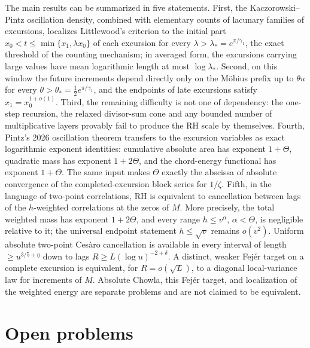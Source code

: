 \documentclass[11pt]{amsart}
\numberwithin{equation}{section}
\theoremstyle{plain}
\theoremstyle{definition}
\theoremstyle{remark}
\begin{document}
The main results can be summarized in five statements. First, the
Kaczorowski--Pintz oscillation density, combined with elementary counts of
lacunary families of excursions, localizes Littlewood's criterion to the
initial part $x_0<t\le\min\{x_1,\lambda x_0\}$ of each excursion for every
$\lambda>\lambda_*=e^{\pi/\gamma_1}$, the exact threshold of the counting
mechanism; in averaged form, the excursions carrying large values have mean
logarithmic length at most $\log\lambda_*$. Second, on this window the
future increments depend directly only on the M\"obius prefix up to
$\theta u$ for every $\theta>\theta_*=\frac12e^{\pi/\gamma_1}$, and the
endpoints of late excursions satisfy $x_1=x_0^{1+o(1)}$. Third, the
remaining difficulty is not one of dependency: the one-step recursion, the
relaxed divisor-sum cone and any bounded number of multiplicative layers
provably fail to produce the RH scale by themselves. Fourth, Pintz's 2026
oscillation theorem transfers to the excursion variables as exact
logarithmic exponent identities: cumulative absolute area has exponent
$1+\Theta$, quadratic mass has exponent $1+2\Theta$, and the chord-energy
functional has exponent $1+\Theta$.  The same input makes $\Theta$ exactly
the abscissa of absolute convergence of the completed-excursion block
series for $1/\zeta$. Fifth, in the language of two-point correlations, RH
is equivalent to cancellation between lags of the $h$-weighted correlations
at the zeros of $M$.  More precisely, the total weighted mass has exponent
$1+2\Theta$, and every range $h\le v^\alpha$, $\alpha<\Theta$, is negligible
relative to it; the universal endpoint statement $h\le\sqrt v$ remains
$o(v^2)$. Uniform absolute two-point Ces\`aro cancellation is available in
every interval of length $\ge u^{3/5+\eta}$ down to lags
$R\ge L(\log u)^{-2+\delta}$. A distinct, weaker Fej\'er target on a complete
excursion is equivalent, for $R=o(\sqrt L)$, to a diagonal local-variance
law for increments of $M$. Absolute Chowla, this Fej\'er target, and
localization of the weighted energy are separate problems and are not
claimed to be equivalent.

\section{Open problems}
\label{sec:open_questions}
\end{document}
